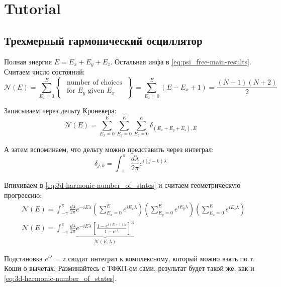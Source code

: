 \section{Tutorial}
\subsection{Трехмерный гармонический осциллятор}
Полная энергия $E = E_x + E_y + E_z$.
Остальная инфа в \eqref{eq:psi_free-main-results}.
Считаем число состояний:
\begin{equation}
    \label{eq:3d-harmonic-number_of_states}
    \mathcal{N}(E)=
    \sum_{E_{x}=0}^{E}\left\{\begin{array}{c}\text { number of choices } \\ \text { for } E_{y} \text { given } E_{x}\end{array}\right\}=
    \sum_{E_{x}=0}^{E}\left(E-E_{x}+1\right) =
    \frac{(N+1)(N+2)}{2}
\end{equation}

Записываем через дельту Кронекера:
\begin{equation}
    \label{eq:3d-harmonic-number_of_states-kroneker}
    \mathcal{N}(E)=\sum_{E_{x}=0}^{E} \sum_{E_{y}=0}^{E} \sum_{E_{z}=0}^{E} \delta_{\left(E_{x}+E_{y}+E_{z}\right), E}
\end{equation}

А затем вспоминаем, что дельту можно представить через интеграл:
\begin{equation}
    \label{eq:kroneker_delta-integral}
    \delta_{j, k}=\int_{-\pi}^{\pi} \frac{d \lambda}{2 \pi} e^{i(j-k) \lambda}
\end{equation}

Впихиваем в \eqref{eq:3d-harmonic-number_of_states} и считаем геометрическую прогрессию:
\begin{align}
    \label{eq:3d-harmonic-number_of_states-via-integral}
    & \mathcal{N}(E)=\int_{-\pi}^{\pi} \frac{d \lambda}{2 \pi} e^{-i E \lambda}\left(\sum_{E_{x}=0}^{E} e^{i E_{x} \lambda}\right)\left(\sum_{E_{y}=0}^{E} e^{i E_{y} \lambda}\right)\left(\sum_{E_{z}=0}^{E} e^{i E_{z} \lambda}\right) \\
    & \mathcal{N}(E)=\int_{-\pi}^{\pi} \frac{d \lambda}{2 \pi} \underbrace{e^{-i E \lambda}\left[\frac{1-e^{i(E+1) \lambda}}{1-e^{i \lambda}}\right]^{3}}_{\mathcal{N}(E, \lambda)}
\end{align}

Подстановка $e^{i\lambda} = z$ сводит интеграл к комплексному, который можно взять по т. Коши о вычетах.
Разминайтесь с ТФКП-ом сами, результат будет такой же, как и \eqref{eq:3d-harmonic-number_of_states}.


